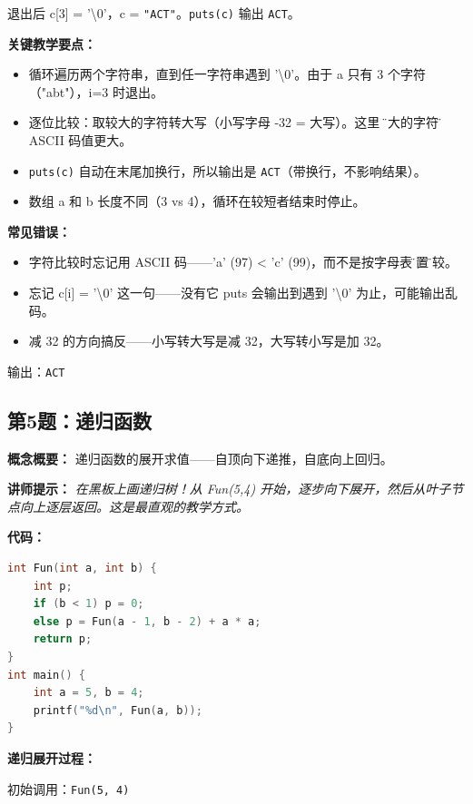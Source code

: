 \noindent 退出后 c[3] = '\textbackslash 0'，c = \texttt{"ACT"}。\texttt{puts(c)} 输出 \texttt{ACT}。

\textbf{关键教学要点：}
\begin{itemize}
    \item 循环遍历两个字符串，直到任一字符串遇到 '\textbackslash 0'。由于 a 只有 3 个字符（"abt"），i=3 时退出。
    \item 逐位比较：取较大的字符转大写（小写字母 -32 = 大写）。这里 \"较大的字符\" 指 ASCII 码值更大。
    \item \texttt{puts(c)} 自动在末尾加换行，所以输出是 \texttt{ACT}（带换行，不影响结果）。
    \item 数组 a 和 b 长度不同（3 vs 4），循环在较短者结束时停止。
\end{itemize}

\textbf{常见错误：}
\begin{itemize}
    \item 字符比较时忘记用 ASCII 码——'a' (97) < 'c' (99)，而不是按字母表\"位置\"比较。
    \item 忘记 c[i] = '\textbackslash 0' 这一句——没有它 puts 会输出到遇到 '\textbackslash 0' 为止，可能输出乱码。
    \item 减 32 的方向搞反——小写转大写是减 32，大写转小写是加 32。
\end{itemize}

{\color{highlight}输出：\texttt{ACT}}

\subsection{第5题：递归函数}

\textbf{概念概要：} 递归函数的展开求值——自顶向下递推，自底向上回归。

\medskip
\textbf{讲师提示：} \textit{在黑板上画递归树！从 Fun(5,4) 开始，逐步向下展开，然后从叶子节点向上逐层返回。这是最直观的教学方式。}

\smallskip
\textbf{代码：}
\begin{lstlisting}[language=C]
int Fun(int a, int b) {
    int p;
    if (b < 1) p = 0;
    else p = Fun(a - 1, b - 2) + a * a;
    return p;
}
int main() {
    int a = 5, b = 4;
    printf("%d\n", Fun(a, b));
}
\end{lstlisting}

\smallskip
\textbf{递归展开过程：}

\noindent 初始调用：\texttt{Fun(5, 4)}

